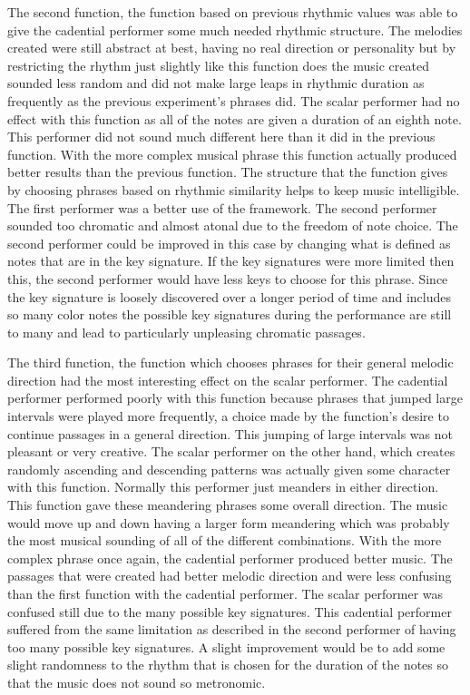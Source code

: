 \documentclass[12pt]{ucthesis}
\begin{document}
{The second function, the function based on previous rhythmic values was able to give the cadential performer some much needed rhythmic structure. The melodies created were still abstract at best, having no real direction or personality but by restricting the rhythm just slightly like this function does the music created sounded less random and did not make large leaps in rhythmic duration as frequently as the previous experiment's phrases did. The scalar performer had no effect with this function as all of the notes are given a duration of an eighth note. This performer did not sound much different here than it did in the previous function. With the more complex musical phrase this function actually produced better results than the previous function. The structure that the function gives by choosing phrases based on rhythmic similarity helps to keep music intelligible. The first performer was a better use of the framework. The second performer sounded too chromatic and almost atonal due to the freedom of note choice. The second performer could be improved in this case by changing what is defined as notes that are in the key signature. If the key signatures were more limited then this, the second performer would have less keys to choose for this phrase. Since the key signature is loosely discovered over a longer period of time and includes so many color notes the possible key signatures during the performance are still to many and lead to particularly unpleasing chromatic passages.

The third function, the function which chooses phrases for their general melodic direction had the most interesting effect on the scalar performer. The cadential performer performed poorly with this function because phrases that jumped large intervals were played more frequently, a choice made by the function's desire to continue passages in a general direction. This jumping of large intervals was not pleasant or very creative. The scalar performer on the other hand, which creates randomly ascending and descending patterns was actually given some character with this function. Normally this performer just meanders in either direction. This function gave these meandering phrases some overall direction. The music would move up and down having a larger form meandering which was probably the most musical sounding of all of the different combinations. With the more complex phrase once again, the cadential performer produced better music. The passages that were created had better melodic direction and were less confusing than the first function with the cadential performer. The scalar performer was confused still due to the many possible key signatures. This cadential performer suffered from the same limitation as described in the second performer of having too many possible key signatures.  A slight improvement would be to add some slight randomness to the rhythm that is chosen for the duration of the notes so that the music does not sound so metronomic. 

}
\end{document}
